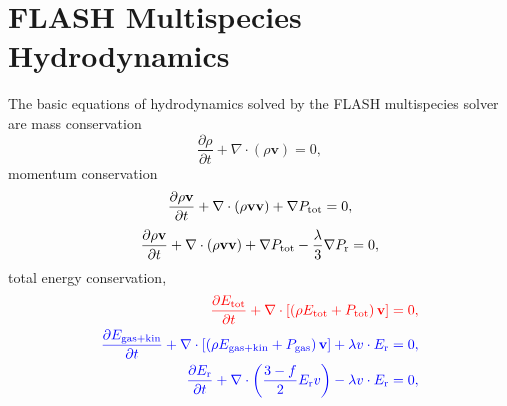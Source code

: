 \documentclass[preprint,11pt]{aastex}
\newcommand{\beq}{\begin{equation}}
\newcommand{\eeq}{\end{equation}}
\newcommand{\bea}{\begin{eqnarray}}
\newcommand{\eea}{\end{eqnarray}}
\begin{document}
\section{FLASH Multispecies Hydrodynamics}
\label{sec:hydro}
The basic equations of hydrodynamics solved by the FLASH multispecies solver are mass conservation
\beq 
\label{eq:e1}
\frac{\partial \rho}{\partial t} + \nabla \cdot (\rho \mathbf{v}) = 0, 
\eeq
momentum conservation
{\color{red}
\beq
\label{eq:e2}
\frac{\partial \rho\mathbf{v}}{\partial t} + \nabla \cdot (\rho\mathbf{v}\mathbf{v}) + \nabla P_{\rm tot} = 0,
\eeq
}
{\color{blue}
\beq
\label{eq:newmom}
\frac{\partial \rho\mathbf{v}}{\partial t} + \nabla \cdot (\rho\mathbf{v}\mathbf{v}) + \nabla P_{\rm tot} - \frac{\lambda}{3} \nabla P_{\rm r}= 0,
\eeq
}
total energy conservation,
\bea
{\color{red}
	\label{eq:e3}
	\frac{\partial E_{\rm tot}}{\partial t} + \nabla \cdot \left[ \left( \rho E_{\rm tot} + P_{\rm tot} \right) \mathbf{v} \right] = 0,
}\\
{\color{blue}
	\label{eq:e3}
	\frac{\partial E_{\rm gas+kin}}{\partial t} + \nabla \cdot \left[ \left( \rho E_{\rm gas+kin} + P_{\rm gas} \right) \mathbf{v} \right] + \lambda v \cdot E_{\rm r} = 0,
}\\
{\color{blue}
	\frac{\partial E_{\rm r}}{\partial t} + \nabla \cdot \left( \frac{3-f}{2} E_{\rm r} v \right)- \lambda v \cdot E_{\rm r} = 0,
}
\eea
\end{document}
